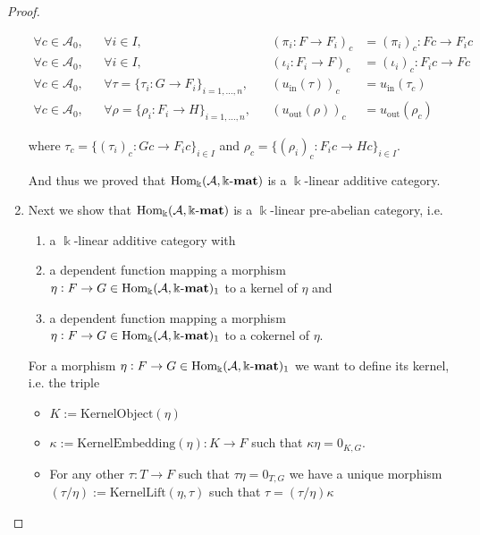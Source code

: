 \begin{proof}
\begin{enumerate}
\begin{subproof}[Proof of (ii)]
\begin{align*}
\forall c \in \mathcal{A}_{0},&& \forall i \in I,&& (\pi_{i} : F \rightarrow F_{i})_{c} &= (\pi_{i})_{c} : Fc \rightarrow F_{i} c \\
\forall c \in \mathcal{A}_{0},&& \forall i \in I,&& (\iota_{i} : F_{i} \rightarrow F)_{c} &= (\iota_{i})_{c} : F_{i} c \rightarrow Fc \\
\forall c \in \mathcal{A}_{0},&& \forall \tau = \{ \tau_{i} : G \rightarrow F_{i} \}_{i = 1,\dots,n},&&
(u_{\mathrm{in}}(\tau))_{c} &= u_{\mathrm{in}}(\tau_{c}) \\
\forall c \in \mathcal{A}_{0},&& \forall \rho = \{ \rho_{i} : F_{i} \rightarrow H \}_{i = 1,\dots,n},&&
(u_{\mathrm{out}}(\rho))_{c} &= u_{\mathrm{out}}(\rho_{c})
\end{align*}

where $\tau_{c} = \{ (\tau_{i})_{c} : Gc \rightarrow F_{i}c \}_{i \in I}$ and $\rho_{c} = \{ (\rho_{i})_{c} : F_{i} c \rightarrow Hc \}_{i \in I}$.

And thus we proved that $\mathrm{Hom_{\Bbbk}}(\mathcal{A},\Bbbk\textnormal{-}\mathbf{mat})$ is a $\Bbbk$-linear additive category.
\end{subproof}

\item Next we show that $\mathrm{Hom_{\Bbbk}}(\mathcal{A},\Bbbk\textnormal{-}\mathbf{mat})$ is a $\Bbbk$-linear pre-abelian category, i.e.
\begin{enumerate}[align=left, leftmargin=0pt]
\renewcommand{\labelenumii}{(\roman{enumii})}
\item a $\Bbbk$-linear additive category with
\item a dependent function mapping a morphism $\eta : F \rightarrow G \in \mathrm{Hom_{\Bbbk}}(\mathcal{A},\Bbbk\textnormal{-}\mathbf{mat})_{1}$ to a kernel of $\eta$ and
\item a dependent function mapping a morphism $\eta : F \rightarrow G \in \mathrm{Hom_{\Bbbk}}(\mathcal{A},\Bbbk\textnormal{-}\mathbf{mat})_{1}$ to a cokernel of $\eta$.
\end{enumerate}
\begin{subproof}[Proof of (ii)]
For a morphism $\eta : F \rightarrow G \in \mathrm{Hom_{\Bbbk}}(\mathcal{A},\Bbbk\textnormal{-}\mathbf{mat})_{1}$ we want to define its kernel, i.e. the triple
\begin{itemize}
\item $K := \mathrm{KernelObject}(\eta)$
\item $\kappa := \mathrm{KernelEmbedding}(\eta) : K \rightarrow F$ such that $\kappa \eta = 0_{K,G}$.
\item For any other $\tau : T \rightarrow F$ such that $\tau\eta = 0_{T,G}$ we have a unique morphism
$(\tau / \eta) := \mathrm{KernelLift}(\eta,\tau)$ such that $\tau = (\tau / \eta) \kappa$
\end{itemize}


\end{subproof}
\end{enumerate}
\end{proof}
